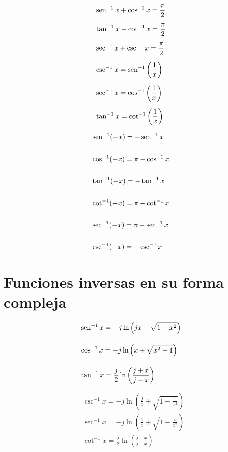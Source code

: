 \begin{minipage}[t]{0.5\textwidth}
\begin{align*}
& \operatorname{sen}^{-1} x + \cos^{-1} x = \frac{\pi}{2}\\[5pt]
& \tan^{-1} x + \cot^{-1} x = \frac{\pi}{2}\\[5pt]
& \sec^{-1} x + \csc^{-1} x = \frac{\pi}{2}\\[5pt]
& \csc^{-1} x = \operatorname{sen}^{-1} \left( \frac{1}{x} \right)\\[5pt]
& \sec^{-1} x = \cos^{-1} \left( \frac{1}{x} \right)\\[5pt]
& \tan^{-1} x = \cot^{-1} \left( \frac{1}{x} \right)
\end{align*}

\end{minipage} 
\begin{minipage}[t]{0.5\textwidth}
\begin{align*}
& \operatorname{sen}^{-1} (-x) = -\operatorname{sen}^{-1} x\\\\
& \cos^{-1} (-x) = \pi -\cos^{-1} x\\\\
& \tan^{-1} (-x) = -\tan^{-1} x\\\\
& \cot^{-1} (-x) = \pi-\cot^{-1} x\\\\
& \sec^{-1} (-x) = \pi-\sec^{-1} x\\\\
& \csc^{-1} (-x) = -\csc^{-1} x
\end{align*}
\end{minipage}

\section*{Funciones inversas en su forma compleja}

\begin{minipage}[c]{0.5\textwidth}
\begin{align*}
& \operatorname{sen}^{-1} x = -j \ln\left( jx + \sqrt{1-x^2} \right)\\[10pt]
& \cos^{-1} x = -j \ln\left( x + \sqrt{x^2-1} \right)\\[10pt]
& \tan^{-1} x = \frac{j}{2}\ln \left( \frac{j+x}{j-x} \right)
\end{align*}

\end{minipage} 
\begin{minipage}[c]{0.5\textwidth}
\begin{align*}
& \csc^{-1} x = -j\ln \left( \frac{j}{x}+\sqrt{1- \frac{1}{x^2}} \right)\\[5pt]
& \sec^{-1} x = -j\ln \left( \frac{1}{x}+\sqrt{1- \frac{i}{x^2}} \right)\\[5pt]
& \cot^{-1} x = \frac{j}{2} \ln \left( \frac{j-x}{j+x} \right)
\end{align*}
\end{minipage}
\clearpage


